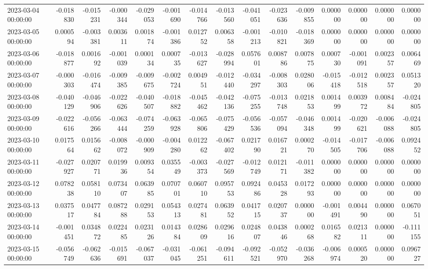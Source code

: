 \begin{tabular}{lrrrrrrrrrrrrrr}
2023-03-04 00:00:00 & -0.018830 & -0.015231 & -0.000344 & -0.029053 & -0.001690 & -0.014766 & -0.013560 & -0.041051 & -0.023636 & -0.009855 & 0.000000 & 0.000000 & 0.000000 & 0.000000 \\
2023-03-05 00:00:00 & 0.000594 & -0.003381 & 0.003611 & 0.001874 & -0.001386 & 0.012752 & 0.006358 & -0.001213 & -0.010821 & -0.018369 & 0.000000 & 0.000000 & 0.000000 & 0.000000 \\
2023-03-06 00:00:00 & -0.018877 & 0.001692 & -0.001039 & 0.000134 & 0.000735 & -0.013627 & -0.028994 & 0.057601 & 0.008786 & 0.007875 & 0.000730 & -0.001091 & 0.002357 & 0.006469 \\
2023-03-07 00:00:00 & -0.000303 & -0.016474 & -0.009385 & -0.009675 & -0.002724 & 0.004951 & -0.012440 & -0.034297 & -0.008303 & 0.028006 & -0.015418 & -0.012518 & 0.002357 & 0.051320 \\
2023-03-08 00:00:00 & -0.040129 & -0.046906 & -0.022626 & -0.040507 & -0.018882 & -0.045462 & -0.042136 & -0.075255 & -0.013748 & 0.021853 & 0.001499 & 0.003972 & 0.008484 & -0.024805 \\
2023-03-09 00:00:00 & -0.022616 & -0.056266 & -0.063444 & -0.074259 & -0.063928 & -0.065806 & -0.075429 & -0.056536 & -0.057094 & -0.046348 & 0.001499 & -0.020621 & -0.006088 & -0.024805 \\
2023-03-10 00:00:00 & 0.017564 & 0.015662 & -0.008072 & -0.000909 & -0.004280 & 0.012262 & -0.067402 & 0.021790 & 0.016721 & 0.000270 & -0.014505 & -0.017706 & -0.006088 & 0.092452 \\
2023-03-11 00:00:00 & -0.027927 & 0.020771 & 0.019936 & 0.009354 & 0.035549 & -0.003373 & -0.027569 & -0.012749 & 0.012171 & -0.011382 & 0.000000 & 0.000000 & 0.000000 & 0.000000 \\
2023-03-12 00:00:00 & 0.078238 & 0.058110 & 0.073407 & 0.063985 & 0.070701 & 0.060710 & 0.095753 & 0.092486 & 0.045328 & 0.017293 & 0.000000 & 0.000000 & 0.000000 & 0.000000 \\
2023-03-13 00:00:00 & 0.037517 & 0.047784 & 0.087288 & 0.029153 & 0.054313 & 0.027481 & 0.063952 & 0.041715 & 0.020737 & 0.000000 & -0.001491 & 0.004490 & 0.000000 & 0.067051 \\
2023-03-14 00:00:00 & -0.001451 & 0.034872 & 0.022485 & 0.023126 & 0.014384 & 0.028609 & 0.029616 & 0.024807 & 0.043846 & 0.000268 & 0.016582 & 0.021311 & 0.000000 & -0.111155 \\
2023-03-15 00:00:00 & -0.056749 & -0.062636 & -0.015691 & -0.067037 & -0.031045 & -0.061251 & -0.094611 & -0.092521 & -0.052970 & -0.036268 & -0.006974 & 0.000520 & 0.000000 & 0.096727 \\

\end{tabular}
